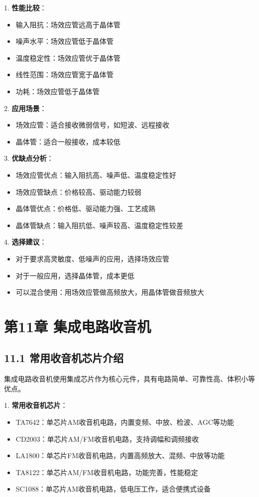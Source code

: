 \documentclass[12pt,UTF8]{ctexbook}
\begin{document}
1. \textbf{性能比较}：
   \begin{itemize}[leftmargin=3.5em]
   \item 输入阻抗：场效应管远高于晶体管
   \item 噪声水平：场效应管低于晶体管
   \item 温度稳定性：场效应管优于晶体管
   \item 线性范围：场效应管宽于晶体管
   \item 功耗：场效应管低于晶体管
   \end{itemize}

2. \textbf{应用场景}：
   \begin{itemize}[leftmargin=3.5em]
   \item 场效应管：适合接收微弱信号，如短波、远程接收
   \item 晶体管：适合一般接收，成本较低
   \end{itemize}

3. \textbf{优缺点分析}：
   \begin{itemize}[leftmargin=3.5em]
   \item 场效应管优点：输入阻抗高、噪声低、温度稳定性好
   \item 场效应管缺点：价格较高、驱动能力较弱
   \item 晶体管优点：价格低、驱动能力强、工艺成熟
   \item 晶体管缺点：输入阻抗低、噪声较高、温度稳定性较差
   \end{itemize}

4. \textbf{选择建议}：
   \begin{itemize}[leftmargin=3.5em]
   \item 对于要求高灵敏度、低噪声的应用，选择场效应管
   \item 对于一般应用，选择晶体管，成本更低
   \item 可以混合使用：用场效应管做高频放大，用晶体管做音频放大
   \end{itemize}

\chapter*{第11章 集成电路收音机}
\section*{11.1 常用收音机芯片介绍}

集成电路收音机使用集成芯片作为核心元件，具有电路简单、可靠性高、体积小等优点。

1. \textbf{常用收音机芯片}：
   \begin{itemize}[leftmargin=3.5em]
   \item TA7642：单芯片AM收音机电路，内置变频、中放、检波、AGC等功能
   \item CD2003：单芯片AM/FM收音机电路，支持调幅和调频接收
   \item LA1800：单芯片FM收音机电路，内置高频放大、混频、中放等功能
   \item TA8122：单芯片AM/FM收音机电路，功能完善，性能稳定
   \item SC1088：单芯片AM收音机电路，低电压工作，适合便携式设备
   \end{itemize}
\end{document}
